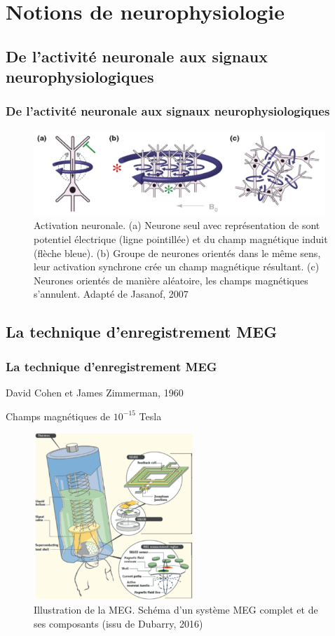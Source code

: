 \documentclass{beamer}
\begin{document}
\section{Notions de neurophysiologie}
\subsection{De l'activité neuronale aux signaux neurophysiologiques}

\begin{frame}
\frametitle{De l'activité neuronale aux signaux neurophysiologiques}
\begin{figure}[!ht]
    \centering
    \includegraphics[width=11cm]{activation_neurones.png}
    \caption{Activation neuronale. (a) Neurone seul avec représentation de sont potentiel électrique (ligne pointillée) et du champ magnétique induit (flèche bleue). (b) Groupe de neurones orientés dans le même sens, leur activation synchrone crée un champ magnétique résultant. (c) Neurones orientés de manière aléatoire, les champs magnétiques s'annulent. Adapté de Jasanof, 2007}
    \label{fig1.1}
\end{figure}
\end{frame}

\subsection{La technique d’enregistrement MEG}

\begin{frame}
\frametitle{La technique d'enregistrement MEG}
David Cohen et James Zimmerman, 1960 

Champs magnétiques de $10^{-15}$ Tesla

\begin{figure}[!ht]
    \centering
    \includegraphics[width=6cm]{fonctionnement_meg.png}
    \caption{Illustration de la MEG. Schéma d'un système MEG complet et de ses composants (issu de Dubarry, 2016)}
    \label{fig1.3}
\end{figure}
\end{frame}
\end{document}
